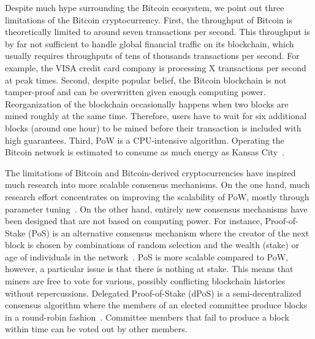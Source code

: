 Despite much hype surrounding the Bitcoin ecosystem, we point out three limitations of the Bitcoin cryptocurrency.
First, the throughput of Bitcoin is theoretically limited to around seven transactions per second.
This throughput is by far not sufficient to handle global financial traffic on its blockchain, which usually requires throughputs of tens of thousands transactions per second.
For example, the VISA credit card company is processing X transactions per second at peak times.
Second, despite popular belief, the Bitcoin blockchain is not tamper-proof and can be overwritten given enough computing power.
Reorganization of the blockchain occasionally happens when two blocks are mined roughly at the same time.
Therefore, users have to wait for six additional blocks (around one hour) to be mined before their transaction is included with high guarantees.
Third, PoW is a CPU-intensive algorithm.
Operating the Bitcoin network is estimated to consume as much energy as Kansas City~\cite{stoll2019carbon}.

The limitations of Bitcoin and Bitcoin-derived cryptocurrencies have inspired much research into more scalable consensus mechanisms.
On the one hand, much research effort concentrates on improving the scalability of PoW, mostly through parameter tuning~\cite{karame2016security}.
On the other hand, entirely new consensus mechanisms have been designed that are not based on computing power.
For instance, Proof-of-Stake (PoS) is an alternative consensus mechanism where the creator of the next block is chosen by combinations of random selection and the wealth (stake) or age of individuals in the network~\cite{king2012ppcoin}.
PoS is more scalable compared to PoW, however, a particular issue is that there is nothing at stake.
This means that miners are free to vote for various, possibly conflicting blockchain histories without repercussions.
Delegated Proof-of-Stake (dPoS) is a semi-decentralized consensus algorithm where the members of an elected committee produce blocks in a round-robin fashion~\cite{larimer2014delegated}.
Committee members that fail to produce a block within time can be voted out by other members.

